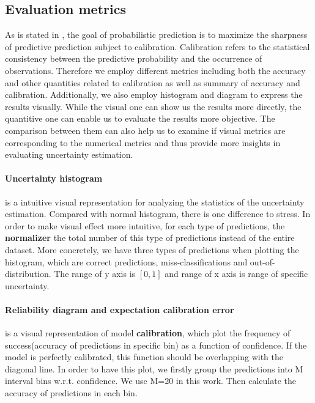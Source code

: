\subsection{Evaluation metrics}
As is stated in \cite{gneiting2007probabilistic}, the goal of probabilistic prediction is to maximize the sharpness of predictive prediction subject to calibration. Calibration refers to the statistical consistency between the predictive probability and the occurrence of observations. Therefore we employ different metrics including both the accuracy and other quantities related to calibration as well as summary of accuracy and calibration. Additionally, we also employ histogram and diagram to express the results visually. While the visual one can show us the results more directly, the quantitive one can enable us to evaluate the results more objective. The comparison between them can also help us to examine if visual metrics are corresponding to the numerical metrics and thus provide more insights in evaluating uncertainty estimation. 

\paragraph{Uncertainty histogram} is a intuitive visual representation for analyzing the statistics of the uncertainty estimation. Compared with normal histogram, there is one difference to stress. In order to make visual effect more intuitive, for each type of predictions, the \textbf{normalizer} the total number of this type of predictions instead of the entire dataset. More concretely, we have three types of predictions when plotting the histogram, which are correct predictions, miss-classifications and out-of-distribution. The range of y axis is $[0,1]$  and range of x axis is range of specific uncertainty.

\paragraph{Reliability diagram and expectation calibration error} is a visual representation of model \textbf{calibration}\cite{guo2017calibration}, which plot the frequency of success(accuracy of predictions in specific bin) as a function of confidence. If the model is perfectly calibrated, this function should be overlapping with the diagonal line. 
In order to have this plot, we firstly group the predictions into M interval bins w.r.t. confidence. We use M=20 in this work. Then calculate the accuracy of predictions in each bin.

